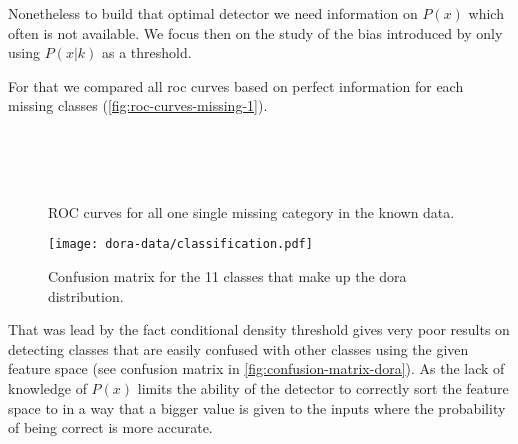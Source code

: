 \documentclass[a4paper]{article}
\begin{document}
Nonetheless to build that optimal detector we need information on $P(x)$ which often is not available.
We focus then on the study of the bias introduced by only using $P(x|k)$ as a threshold.

For that we compared all roc curves based on perfect information for each missing
classes (\autoref{fig:roc-curves-missing-1}).

\begin{figure}[h]
 \centering
  \\
  \\
  \\

\caption{\label{fig:roc-curves-missing-1}ROC curves for all one single missing category in the known data.}
\end{figure}

\begin{figure}
\centering
\texttt{[image: dora-data/classification.pdf]}
\caption{\label{fig:confusion-matrix-dora}
         Confusion matrix for the 11 classes that make up the dora distribution.}
\end{figure}

That was lead by the fact conditional density threshold gives very poor results on detecting classes
that are easily confused with other classes using the given feature space (see confusion matrix in
\autoref{fig:confusion-matrix-dora}).
As the lack of knowledge of $P(x)$ limits the ability of the detector to correctly sort the feature
space to in a way that a bigger value is given to the inputs where the probability of being correct is more accurate.
\end{document}
